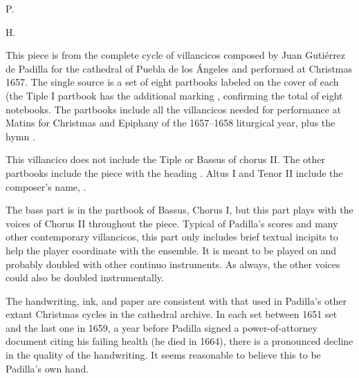 
\begin{notesources}

\item[P.]

\item[H.]

\end{notesources}

This piece is from the complete cycle of villancicos composed by Juan Gutiérrez de Padilla for the cathedral of Puebla de los Ángeles and performed at Christmas 1657.
The single source is a set of eight partbooks labeled  on the cover of each (the Tiple I partbook has the additional marking , confirming the total of eight notebooks.
The partbooks include all the villancicos needed for performance at Matins for Christmas and Epiphany of the 1657--1658 liturgical year, plus the hymn .

This villancico does not include the Tiple or Bassus of chorus II.
The other partbooks include the piece with the heading .
Altus I and Tenor II include the composer's name, .

The bass part is in the partbook of Bassus, Chorus I, but this part plays with the voices of Chorus II throughout the piece.
Typical of Padilla's scores and many other contemporary villancicos, this part only includes brief textual incipits to help the player coordinate with the ensemble.
It is meant to be played on  and probably doubled with other continuo instruments.
As always, the other voices could also be doubled instrumentally.

The handwriting, ink, and paper are consistent with that used in Padilla's other extant Christmas cycles in the cathedral archive.
In each set between 1651 set and the last one in 1659, a year before Padilla signed a power-of-attorney document citing his failing health\autocite{Mauleon:PadillaCivil} (he died in 1664), there is a pronounced decline in the quality of the handwriting.
It seems reasonable to believe this to be Padilla's own hand.


